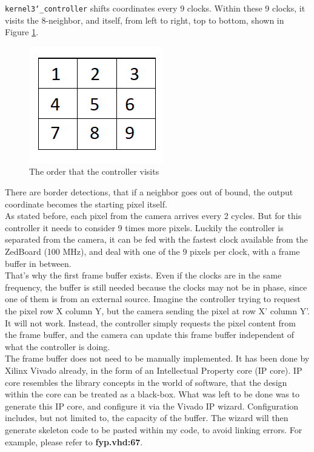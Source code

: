 \documentclass{article}
\begin{document}
	\texttt{kernel3\char`_controller} shifts coordinates every 9 clocks. Within these 9 clocks, it visits the 8-neighbor, and itself, from left to right, top to bottom, shown in Figure \ref{fig:lefttoright}.
	\begin{figure}[h]
		\centering
		\includegraphics[scale=0.9]{lefttoright}
		\caption{The order that the controller visits}
		\label{fig:lefttoright}
	\end{figure} There are border detections, that if a neighbor goes out of bound, the output coordinate becomes the starting pixel itself.
	\\
	
	As stated before, each pixel from the camera arrives every 2 cycles. But for this controller it needs to consider 9 times more pixels. Luckily the controller is separated from the camera, it can be fed with the fastest clock available from the ZedBoard (100 MHz), and deal with one of the 9 pixels per clock, with a frame buffer in between.
	\\
	
	That's why the first frame buffer exists. Even if the clocks are in the same frequency, the buffer is still needed because the clocks may not be in phase, since one of them is from an external source. Imagine the controller trying to request the pixel row X column Y, but the camera sending the pixel at row X' column Y'. It will not work. Instead, the controller simply requests the pixel content from the frame buffer, and the camera can update this frame buffer independent of what the controller is doing.
	\\
	
	The frame buffer does not need to be manually implemented. It has been done by Xilinx Vivado already, in the form of an Intellectual Property core (IP core). IP core resembles the library concepts in the world of software, that the design within the core can be treated as a black-box. What was left to be done was to generate this IP core, and configure it via the Vivado IP wizard. Configuration includes, but not limited to, the capacity of the buffer. The wizard will then generate skeleton code to be pasted within my code, to avoid linking errors. For example, please refer to \textbf{fyp.vhd:67}.
	\\
	
\end{document}
